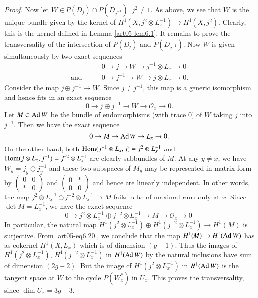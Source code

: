 \begin{proof}
Now let $W\in P(D_{j})\cap P(D_{j^{-1}})$, $j^{2}\neq 1$. As above, we
see that $W$ is the unique bundle given by the kernel of
$H^{1}(X,j^{2}\otimes L^{-1}_{x})\to H^{1}(X,j^{2})$. Clearly, this is
the kernel defined in Lemma \ref{art05-lem6.1}. It remains to prove
the transversality of the intersection of $P(D_{j})$ and
$P(D_{j^{-1}})$. Now $W$ is given simultaneously by two exact sequences 
\begin{align*}
 & 0\to j\to W\to j^{-1}\otimes L_{x}\to 0\\
\text{and}\qquad & 0\to j^{-1}\to W\to j\otimes L_{x}\to 0.
\end{align*}\pageoriginale
Consider the map $j\oplus j^{-1}\to W$. Since $j\neq j^{-1}$, this map
is a generic isomorphism and hence fits in an exact sequence
$$
0\to j\oplus j^{-1}\to W\to \mathscr{O}_{x}\to 0.
$$
Let $M\subset \operatorname{Ad} W$ be the bundle of endomorphisms (with trace $0$)
of $W$ taking $j$ into $j^{-1}$. Then we have the exact sequence
\setcounter{equation}{19}
\begin{equation}
0\to M\to \operatorname{Ad} W\to L_{x}\to 0.\label{art05-eq6.20}
\end{equation}
On the other hand, both $\operatorname{Hom} (j^{-1}\otimes L_{x},j)=j^{2}\otimes
L^{-1}_{x}$ and $\operatorname{Hom}(j\otimes L_{x},j^{-1})=j^{-2}\otimes L_{x}^{-1}$
are clearly subbundles of $M$. At any $y\neq x$, we have
$W_{y}=j_{y}\oplus j^{-1}_{y}$ and these two subspaces of $M_{y}$ may
be represented in matrix form by $\left(\begin{smallmatrix} 0 &
0\\ \ast & 0\end{smallmatrix}\right)$ and $\left(\begin{smallmatrix} 0 &
\ast\\ 0 & 0\end{smallmatrix}\right)$ and hence are linearly
independent. In other words, the map $j^{2}\otimes L^{-1}_{x}\oplus
j^{-2}\otimes L_{x}^{-1}\to M$ fails to be of maximal rank only at
$x$. Since $\det M=L^{-1}_{x}$, we have the exact sequence
$$
0\to j^{2}\otimes L^{-1}_{x}\oplus j^{-2}\otimes L^{-1}_{x}\to
M\to \mathscr{O}_{x}\to 0.
$$
In particular, the natural map $H^{1}(j^{2}\otimes L^{-1}_{x})\oplus
H^{1}(j^{-2}\otimes L_{x}^{-1})\to H^{1}(M)$ is
surjective. From \eqref{art05-eq6.20}, we conclude that the map
$H^{1}(M)\to H^{1}(\operatorname{Ad} W)$ has as cokernel $H^{1}(X,L_{x})$ which is
of dimension $(g-1)$. Thus the images of $H^{1}(j^{2}\otimes
L^{-1}_{x})$, $H^{1}(j^{-2}\otimes L^{-1}_{x})$ in $H^{1}(\operatorname{Ad} W)$ by
the natural inclusions have sum of dimension $(2g-2)$. But the image
of $H^{1}(j^{2}\otimes L^{-1}_{x})$ in $H^{1}(\operatorname{Ad} W)$ is the tangent
space at $W$ to the cycle $P(W^{*}_{x})$ in $U_{x}$. This proves the
transversality, since $\dim U_{x}=3g-3$.  
\end{proof}

